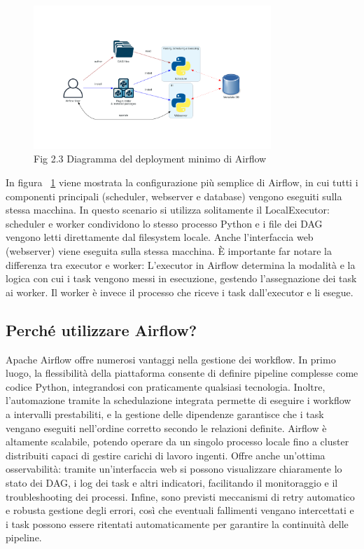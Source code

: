 \begin{figure}[h]
    \centering
    \includegraphics[width=0.8\textwidth]{img/diagram_basic_airflow_architecture.png}
    \caption{Fig 2.3 Diagramma del deployment minimo di Airflow}
    \label{fig:airflow_minimal_deployment}
\end{figure}

In figura ~\ref{fig:airflow_minimal_deployment} viene mostrata la configurazione più semplice di Airflow, in cui tutti i componenti principali (scheduler, webserver e database) vengono eseguiti sulla stessa macchina. In questo scenario si utilizza solitamente il LocalExecutor: scheduler e worker condividono lo stesso processo Python e i file dei DAG vengono letti direttamente dal filesystem locale. Anche l’interfaccia web (webserver) viene eseguita sulla stessa macchina. È importante far notare la differenza tra executor e worker: 
L’executor in Airflow determina la modalità e la logica con cui i task vengono messi in esecuzione, gestendo l’assegnazione dei task ai worker.
Il worker è invece il processo che riceve i task dall’executor e li esegue.

\subsection{Perché utilizzare Airflow?}
\label{sec:percheairflow}
Apache Airflow offre numerosi vantaggi nella gestione dei workflow. In primo luogo, la flessibilità della piattaforma consente di definire pipeline complesse come codice Python, integrandosi con praticamente qualsiasi tecnologia. Inoltre, l’automazione tramite la schedulazione integrata permette di eseguire i workflow a intervalli prestabiliti, e la gestione delle dipendenze garantisce che i task vengano eseguiti nell’ordine corretto secondo le relazioni definite. Airflow è altamente scalabile, potendo operare da un singolo processo locale fino a cluster distribuiti capaci di gestire carichi di lavoro ingenti. Offre anche un’ottima osservabilità: tramite un’interfaccia web si possono visualizzare chiaramente lo stato dei DAG, i log dei task e altri indicatori, facilitando il monitoraggio e il troubleshooting dei processi. Infine, sono previsti meccanismi di retry automatico e robusta gestione degli errori, così che eventuali fallimenti vengano intercettati e i task possono essere ritentati automaticamente per garantire la continuità delle pipeline.

